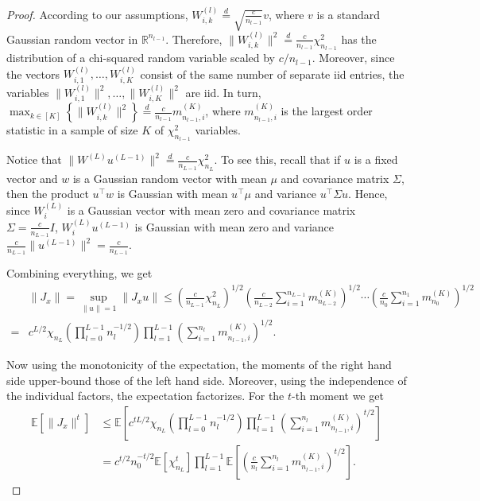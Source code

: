 \documentclass{article}
\theoremstyle{definition}
\begin{document}
\begin{proof}
According to our assumptions, $W_{i,k}^{(l)} \stackrel{d}{=} \sqrt{\frac{c}{n_{l-1}}} v$, where $v$ is a standard Gaussian random vector in $\mathbb{R}^{n_{l-1}}$.  
Therefore, $\|W_{i,k}^{(l)}\|^2 \stackrel{d}{=} \frac{c}{n_{l-1}} \chi_{n_{l-1}}^2$ has the distribution of a  chi-squared random variable scaled by $c/n_{l-1}$. 
Moreover, since the vectors $W_{i,1}^{(l)},\ldots, W_{i,K}^{(l)}$ consist of the same number of separate iid entries, the variables $\|W_{i,1}^{(l)}\|^2,\ldots, \|W_{i,K}^{(l)}\|^2$ are iid. 
%
In turn, $\max_{k \in [K]} \left\{ \|W_{i,k}^{(l)}\|^2 \right\} \stackrel{d}{=} \frac{c}{n_{l-1}} m^{(K)}_{n_{l-1}, i}$, where $m^{(K)}_{n_{l-1}, i}$ is the largest order statistic in a sample of size $K$ of $\chi_{n_{l-1}}^2$ variables.

Notice that $\|W^{(L)} u^{(L-1)}\|^2 \stackrel{d}{=} \frac{c}{n_{L-1}} \chi^2_{n_{L}}$. 
To see this, recall that if $u$ is a fixed vector and $w$ is a Gaussian random vector with mean $\mu$ and covariance matrix $\Sigma$, then the product $u^\top w$ is Gaussian with mean $u^\top \mu$ and variance $u^\top \Sigma u$. 
Hence, since $W^{(L)}_i$ is a Gaussian vector with mean zero and covariance matrix $\Sigma = \frac{c}{n_{L-1}}I$, $W^{(L)}_i u^{(L-1)}$ is Gaussian with mean zero and variance $\frac{c}{n_{L-1}}\|u^{(L-1)}\|^2=\frac{c}{n_{L-1}}$.


Combining everything, we get
\begin{align*}
    &\|J_x\| = \sup_{\|u\| = 1} \| J_x u \| \leq \left( \frac{c}{n_{L-1}} \chi^2_{n_{L}}\right)^{1/2}
    \left( \frac{c}{n_{L - 2}} \sum_{i=1}^{n_{L - 1}} m^{(K)}_{n_{L - 2}} \right)^{1/2} \cdots
    \left( \frac{c}{n_{0}} \sum_{i=1}^{n_{1}} m^{(K)}_{n_0} \right)^{1/2}
    \\
    = &c^{L/2} \chi_{n_{L}} \left(\prod_{l=0}^{L-1} n_l^{-1/2}\right) \prod_{l = 1}^{L-1} \left(\sum_{i=1}^{n_l} m^{(K)}_{n_{l-1}, i} \right)^{1/2}.
\end{align*}

Now using the monotonicity of the expectation, the moments of the right hand side upper-bound those of the left hand side. 
Moreover, using the independence of the individual factors, the expectation factorizes. 
For the $t$-th moment we get 
    \begin{align*}
        \mathbb{E}[\| J_x \|^t]
        & \leq \mathbb{E} \left[ c^{t L/2} \chi_{n_{L}} \left(\prod_{l=0}^{L-1} n_l^{-1/2}\right) \prod_{l = 1}^{L-1} \left(\sum_{i=1}^{n_l}  m^{(K)}_{n_{l-1}, i} \right)^{t/2} \right]\\
        & = c^{t/2} n_0^{-t/2} \mathbb{E}[\chi_{n_{L}}^t]  \prod_{l = 1}^{L-1} \mathbb{E} \left[ \left( \frac{c}{n_l} \sum_{i=1}^{n_l}  m^{(K)}_{n_{l-1}, i} \right)^{t/2} \right].
    \end{align*}
\end{proof}
\end{document}
